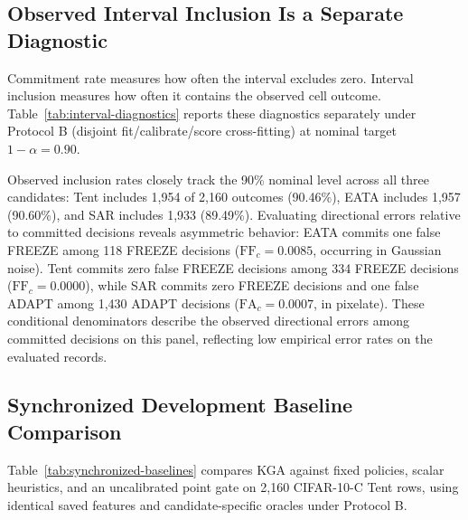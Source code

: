 \subsection{Observed Interval Inclusion Is a Separate Diagnostic}
\label{sec:interval-diagnostics}

Commitment rate measures how often the interval excludes zero. Interval inclusion measures how
often it contains the observed cell outcome. Table~\ref{tab:interval-diagnostics} reports these
diagnostics separately under Protocol B (disjoint fit/calibrate/score cross-fitting) at nominal target
$1-\alpha=0.90$.

\begin{table}[t]
\centering
\footnotesize
\caption{Retrospective interval diagnostics for the controlled cells under Protocol B (disjoint fit/calibrate/score cross-fitting), at nominal target
$1-\alpha=0.90$. Observed inclusion concerns $\Delta^{\mathrm{cell}}$.
Candidate/family breakdowns and directional-error denominators are provided in the supplement.}
\label{tab:interval-diagnostics}
\resizebox{\textwidth}{!}{}
\end{table}

Observed inclusion rates closely track the 90\% nominal level across all three candidates:
Tent includes 1,954 of 2,160 outcomes (90.46\%), EATA includes 1,957 (90.60\%), and SAR includes 1,933 (89.49\%).
Evaluating directional errors relative to committed decisions reveals asymmetric behavior:
EATA commits one false FREEZE among 118 FREEZE decisions ($\mathrm{FF}_c = 0.0085$, occurring in Gaussian noise).
Tent commits zero false FREEZE decisions among 334 FREEZE decisions ($\mathrm{FF}_c = 0.0000$), while SAR commits
zero FREEZE decisions and one false ADAPT among 1,430 ADAPT decisions ($\mathrm{FA}_c = 0.0007$, in pixelate).
These conditional denominators describe the observed directional errors among committed decisions
on this panel, reflecting low empirical error rates on the evaluated records.

\subsection{Synchronized Development Baseline Comparison}
\label{sec:synchronized-baselines}

Table~\ref{tab:synchronized-baselines} compares KGA against fixed policies, scalar heuristics, and an uncalibrated
point gate on 2,160 CIFAR-10-C Tent rows, using identical saved features and candidate-specific oracles under Protocol B.


